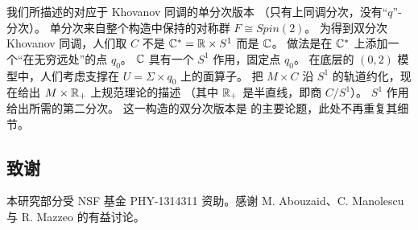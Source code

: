 
我们所描述的对应于 Khovanov 同调的单分次版本
（只有上同调分次，没有“$q$”-分次）。
单分次来自整个构造中保持的对称群 $F\cong Spin(2)$。
为得到双分次 Khovanov 同调，人们取 $C$ 不是 $\mathbb{C}^{*}=\mathbb{R}\times S^1$ 而是 $\mathbb{C}$。
做法是在 $\mathbb{C}^{*}$ 上添加一个“在无穷远处”的点 $q_0$。
$\mathbb{C}$ 具有一个 $S^1$ 作用，固定点 $q_0$。
在底层的 $(0,2)$ 模型中，人们考虑支撑在 $U=\Sigma\times q_0$ 上的面算子。
把 $M\times C$ 沿 $S^1$ 的轨道约化，现在给出 $M\times\mathbb{R}_+$ 上规范理论的描述
（其中 $\mathbb{R}_+$ 是半直线，即商 $C/S^1$）。
$S^1$ 作用给出所需的第二分次。
这一构造的双分次版本是 \cite{W5branes} 的主要论题，此处不再重复其细节。


\subsection*{致谢}
本研究部分受 NSF 基金 PHY-1314311 资助。感谢 M. Abouzaid、C. Manolescu
与 R. Mazzeo 的有益讨论。

